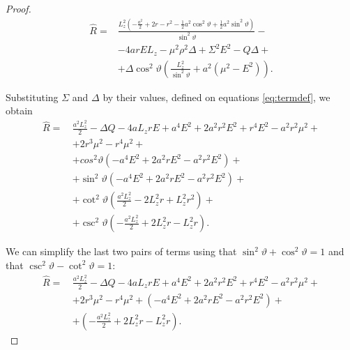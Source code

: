 \begin{proof}
	\begin{align}
	\widehat{R} =& \frac{L_z^2 \left( -\frac{a^2}{2} + 2r - r^2 - \frac{1}{2}a^2\cos^2\vartheta + \frac{1}{2}a^2\sin^2\vartheta\right) }{\sin^2\vartheta} - \nonumber\\
	&- 4 a r E L_z - \mu^2 \rho^2 \Delta + \Sigma^2 E^2 - Q \Delta + \nonumber \\ 
	&+ \Delta\cos^2\vartheta\left(\frac{L_z^2}{\sin^2\vartheta} + a^2\left(\mu^2 - E^2\right)\right).
	\end{align}
	
	Substituting $\Sigma$ and $\Delta$ by their values, defined on equations \ref{eq:termdef}, we obtain
	\begin{align}
	\widehat{R} =\,& \frac{a^2L_z^2}{2} - \Delta Q - 4aL_zrE + a^4E^2 + 2a^2r^2E^2 + r^4E^2 - a^2r^2\mu^2 + \nonumber \\
	&+ 2r^3\mu^2 - r^4\mu^2 + \nonumber\\
	&+ cos^2\vartheta\left(-a^4E^2 + 2a^2rE^2 - a^2r^2E^2 \right) + \nonumber \\
	&+ \sin^2\vartheta\left( -a^4E^2 + 2a^2rE^2 - a^2r^2E^2 \right) + \nonumber\\
	&+ \cot^2\vartheta\left( \frac{a^2L_z^2}{2} - 2L_z^2r + L_z^2r^2 \right) + \nonumber \\
	&+ \csc^2\vartheta\left( -\frac{a^2L_z^2}{2} + 2L_z^2r - L_z^2r \right).
	\end{align}
	
	We can simplify the last two pairs of terms using that $\sin^2 \vartheta + \cos^2 \vartheta = 1$ and that $\csc^2\vartheta - \cot^2\vartheta = 1$:
	\begin{align}
	\widehat{R} =\,& \frac{a^2L_z^2}{2} - \Delta Q - 4aL_zrE + a^4E^2 + 2a^2r^2E^2 + r^4E^2 - a^2r^2\mu^2 + \nonumber \\
	&+ 2r^3\mu^2 - r^4\mu^2 + \left(-a^4E^2 + 2a^2rE^2 - a^2r^2E^2 \right) + \nonumber \\
	&+ \left( -\frac{a^2L_z^2}{2} + 2L_z^2r - L_z^2r \right).
	\end{align}
	

\end{proof}
